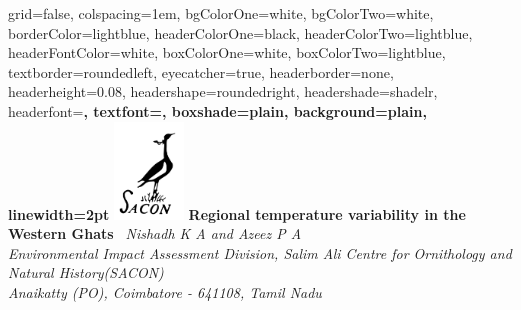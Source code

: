 \documentclass[landscape,final,a0paper,fontscale=0.285]{baposter}
\begin{document}


\begin{poster}%
  {
  grid=false,
  colspacing=1em,
  bgColorOne=white,
  bgColorTwo=white,
  borderColor=lightblue,
  headerColorOne=black,
  headerColorTwo=lightblue,
  headerFontColor=white,
  boxColorOne=white,
  boxColorTwo=lightblue,
  textborder=roundedleft,
  eyecatcher=true,
  headerborder=none,
  headerheight=0.08\textheight,
  headershape=roundedright,
  headershade=shadelr,
  headerfont=\Large\bf\textsc, %
  textfont={\setlength{\parindent}{1.5em}},
  boxshade=plain,
  background=plain,
  linewidth=2pt
  }
  {\includegraphics[height=7em]{images/SACON.png}} 
  {\sf\Large\textbf{Regional temperature variability in the Western Ghats}\vspace{0.1em}}
  {\sf\small\textit{\ Nishadh K A and Azeez P A \\Environmental Impact Assessment Division, Salim Ali Centre for Ornithology and Natural History(SACON)\\ Anaikatty (PO), Coimbatore - 641108, Tamil Nadu}}
  
    \newcommand{\colouredcircle}{%
      \tikz{\useasboundingbox (-0.2em,-0.32em) rectangle(0.2em,0.32em); \draw[draw=black,fill=lightblue,line width=0.03em] (0,0) circle(0.18em);}}


\end{poster}
\end{document}
